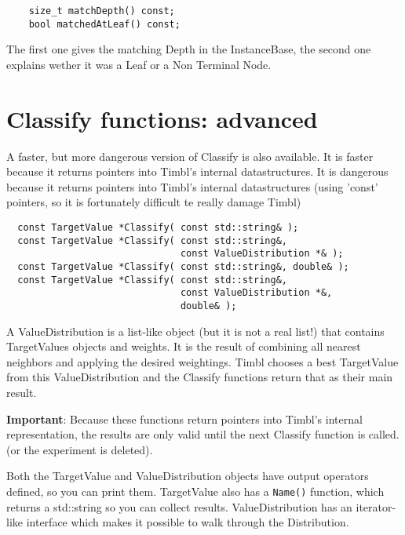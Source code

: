 \documentclass{report}
\begin{document}
\begin{footnotesize}
\begin{verbatim}
    size_t matchDepth() const;
    bool matchedAtLeaf() const;
\end{verbatim}
\end{footnotesize}

The first one gives the matching Depth in the InstanceBase, the second one
explains wether it was a Leaf or a Non Terminal Node.

\section{Classify functions: advanced}

A faster, but more dangerous version of Classify is also available.
It is faster because it returns pointers into Timbl's internal
datastructures. It is dangerous because it returns pointers into
Timbl's internal datastructures (using 'const' pointers, so it is
fortunately difficult te really damage Timbl)

\begin{footnotesize}
\begin{verbatim}
  const TargetValue *Classify( const std::string& );
  const TargetValue *Classify( const std::string&, 
                               const ValueDistribution *& );
  const TargetValue *Classify( const std::string&, double& );
  const TargetValue *Classify( const std::string&, 
                               const ValueDistribution *&, 
                               double& );
\end{verbatim}
\end{footnotesize}

A ValueDistribution is a list-like object (but it is not a real list!)
that contains TargetValues objects and weights. It is the result of
combining all nearest neighbors and applying the desired weightings.
Timbl chooses a best TargetValue from this ValueDistribution and the
Classify functions return that as their main result.

{\bf Important}: Because these functions return pointers into Timbl's
internal representation, the results are only valid until the next
Classify function is called. (or the experiment is deleted).

Both the TargetValue and ValueDistribution objects have output
operators defined, so you can print them.
TargetValue also has a {\tt Name()} function, which returns a
std::string so you can collect results.
ValueDistribution has an iterator-like interface which makes it
possible to walk through the Distribution.
\end{document}
